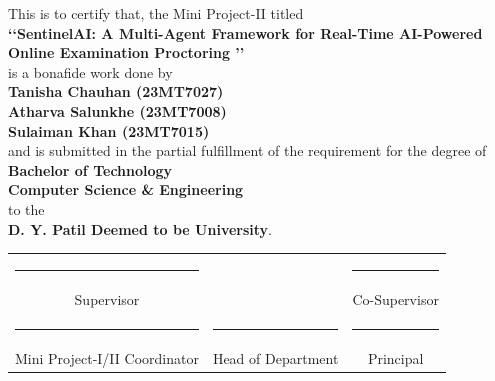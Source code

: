 \begin{center}
\large This is to certify that, the Mini Project-II titled
\vspace{0.15in}\\\textbf{\lq\lq  SentinelAI: A Multi-Agent Framework for Real-Time AI-Powered Online Examination Proctoring \rq\rq} \\
\vspace{0.1in}is a bonafide work done by\vspace{0.15in}
\\\textbf {Tanisha Chauhan (23MT7027) \\{} Atharva Salunkhe (23MT7008) \\{} Sulaiman Khan (23MT7015)} \\\vspace{0.1in} and is submitted in the partial
fulfillment of
the requirement for the degree of \vspace{0.15in} \\\textbf{ Bachelor of Technology} \vspace{0.05in}\\\textbf{ Computer Science \& Engineering} \\to the \\\textbf{D. Y. Patil Deemed to be University}.\\


 \vspace{0.2in}
%
%
%
\begin{tabular*}{\textwidth}{@{\extracolsep{\fill}}ccc@{}}
      \rule{4.0cm}{1sp} &                     & \rule{4.0cm}{1sp} \\
      Supervisor        &                     & Co-Supervisor \\[0.65in]
      \rule{4.0cm}{1sp} & \rule{4.0cm}{1sp}   & \rule{4.0cm}{1sp} \\
      Mini Project-I/II Coordinator & Head of Department & Principal \\
    \end{tabular*}
\end{center}









